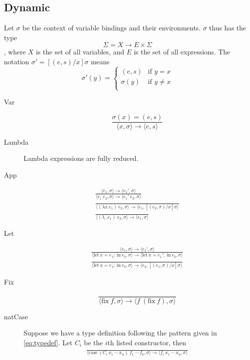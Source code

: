 \documentclass[12pt]{article}
\newcommand{\env}[1]{\langle #1 \rangle}
\begin{document}
\subsection{Dynamic}

Let $\sigma$ be the context of variable bindings and their
environments.
$\sigma$ thus has the type
$$\Sigma = X \to E \times \Sigma$$, where $X$ is the
set of all variables, and $E$ is the set of all expressions.
The notation $\sigma' = [(e, s)/x]\sigma$ means
$$\sigma'(y) =
\begin{cases}
  (e, s) &\text{if } y = x\\
  \sigma(y) &\text{if } y \neq x\\
\end{cases}$$

\begin{description}
\item[Var]
  \begin{equation}
\frac{\sigma(x) = (e, s)}{\env{x, \sigma} \to \env{e, s}}
\end{equation}

\item[Lambda] Lambda expressions are fully reduced.

\item[App] 
  \begin{gather}
    \frac{\env{e_1, \sigma} \to \env{e_1', \sigma}}{\env{e_1~e_2, \sigma} \to \env{e_1'~e_2, \sigma}}\\
    \frac{}{\env{(\lambda x. e_1)~e_2, \sigma} \to \env{e_1, [(e_2, \sigma)/x]\sigma}}\\
    \frac{}{\env{(\lambda \_. e_1)~e_2, \sigma} \to \env{e_1, \sigma}}
  \end{gather}

\item[Let]
  \begin{gather}
    \frac{\env{e_1, \sigma} \to \env{e_1', \sigma}}{\env{\mathrm{let}~x = e_1;~\mathrm{in}~e_2, \sigma} \to \env{\mathrm{let}~x = e_1';~\mathrm{in}~e_2, \sigma}}\\
    \frac{}{\env{\mathrm{let}~x = e_1;~\mathrm{in}~e_2, \sigma} \to \env{e_2, [(e_1, \sigma)/x]\sigma}}
  \end{gather}

\item[Fix]
  \begin{equation}
    \frac{}{\env{\mathrm{fix}~f, \sigma} \to \env{f~(\mathrm{fix}~f), \sigma}}
  \end{equation}

\item[natCase] Suppose we have a type definition following the pattern
  given in \eqref{eq:typedef}.
  Let $C_i$ be the $i$th listed constructor, then
  \begin{gather}
    \frac{}{\env{\mathrm{case}~(C_i~x_1~\cdots~x_n)~f_1~\cdots~f_k, \sigma} \to \env{f_i~x_1~\cdots~x_n, \sigma}}\\
  \end{gather}
\end{description}
\end{document}
